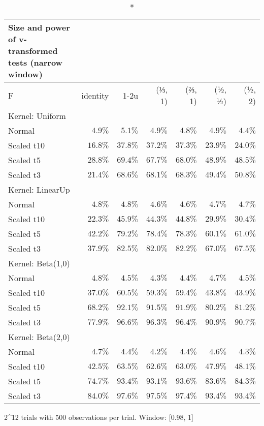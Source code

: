 \setlength{\LTpost}{0mm}
\begin{longtable}{lrrrrrr}
\caption*{
{\large Size and power of v-transformed tests (narrow window)}
} \\ 
\toprule
F & identity & \textbar{}1-2u\textbar{} & (⅓, 1) & (⅔, 1) & (½, ½) & (½, 2) \\ 
\midrule
\multicolumn{7}{l}{Kernel: Uniform} \\ 
\midrule
Normal & $4.9\%$ & $5.1\%$ & $4.9\%$ & $4.8\%$ & $4.9\%$ & $4.4\%$ \\ 
Scaled t10 & $16.8\%$ & $37.8\%$ & $37.2\%$ & $37.3\%$ & $23.9\%$ & $24.0\%$ \\ 
Scaled t5 & $28.8\%$ & $69.4\%$ & $67.7\%$ & $68.0\%$ & $48.9\%$ & $48.5\%$ \\ 
Scaled t3 & $21.4\%$ & $68.6\%$ & $68.1\%$ & $68.3\%$ & $49.4\%$ & $50.8\%$ \\ 
\midrule
\multicolumn{7}{l}{Kernel: LinearUp} \\ 
\midrule
Normal & $4.8\%$ & $4.8\%$ & $4.6\%$ & $4.6\%$ & $4.7\%$ & $4.7\%$ \\ 
Scaled t10 & $22.3\%$ & $45.9\%$ & $44.3\%$ & $44.8\%$ & $29.9\%$ & $30.4\%$ \\ 
Scaled t5 & $42.2\%$ & $79.2\%$ & $78.4\%$ & $78.3\%$ & $60.1\%$ & $61.0\%$ \\ 
Scaled t3 & $37.9\%$ & $82.5\%$ & $82.0\%$ & $82.2\%$ & $67.0\%$ & $67.5\%$ \\ 
\midrule
\multicolumn{7}{l}{Kernel: Beta(1,0)} \\ 
\midrule
Normal & $4.8\%$ & $4.5\%$ & $4.3\%$ & $4.4\%$ & $4.7\%$ & $4.5\%$ \\ 
Scaled t10 & $37.0\%$ & $60.5\%$ & $59.3\%$ & $59.4\%$ & $43.8\%$ & $43.9\%$ \\ 
Scaled t5 & $68.2\%$ & $92.1\%$ & $91.5\%$ & $91.9\%$ & $80.2\%$ & $81.2\%$ \\ 
Scaled t3 & $77.9\%$ & $96.6\%$ & $96.3\%$ & $96.4\%$ & $90.9\%$ & $90.7\%$ \\ 
\midrule
\multicolumn{7}{l}{Kernel: Beta(2,0)} \\ 
\midrule
Normal & $4.7\%$ & $4.4\%$ & $4.2\%$ & $4.4\%$ & $4.6\%$ & $4.3\%$ \\ 
Scaled t10 & $42.5\%$ & $63.5\%$ & $62.6\%$ & $63.0\%$ & $47.9\%$ & $48.1\%$ \\ 
Scaled t5 & $74.7\%$ & $93.4\%$ & $93.1\%$ & $93.6\%$ & $83.6\%$ & $84.3\%$ \\ 
Scaled t3 & $84.0\%$ & $97.6\%$ & $97.5\%$ & $97.4\%$ & $93.4\%$ & $93.4\%$ \\ 
\bottomrule
\end{longtable}
\begin{minipage}{\linewidth}
2\textasciicircum{}12 trials with 500 observations per trial. Window: [0.98, 1]\\
\end{minipage}

